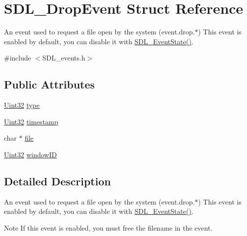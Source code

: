 \hypertarget{struct_s_d_l___drop_event}{}\section{S\+D\+L\+\_\+\+Drop\+Event Struct Reference}
\label{struct_s_d_l___drop_event}


An event used to request a file open by the system (event.\+drop.$\ast$) This event is enabled by default, you can disable it with \mbox{\hyperlink{_s_d_l__events_8h_afb772893e1c46f186fa39a4defe76df3}{S\+D\+L\+\_\+\+Event\+State()}}.  




{\ttfamily \#include $<$S\+D\+L\+\_\+events.\+h$>$}

\subsection*{Public Attributes}
\begin{DoxyCompactItemize}
\item 
\mbox{\hyperlink{_s_d_l__stdinc_8h_add440eff171ea5f55cb00c4a9ab8672d}{Uint32}} \mbox{\hyperlink{struct_s_d_l___drop_event_a5ea27cfaa5f8d4940e9a69b68b3cc035}{type}}
\item 
\mbox{\hyperlink{_s_d_l__stdinc_8h_add440eff171ea5f55cb00c4a9ab8672d}{Uint32}} \mbox{\hyperlink{struct_s_d_l___drop_event_a02d2c81bb22db632a40cd0021ff751ab}{timestamp}}
\item 
char $\ast$ \mbox{\hyperlink{struct_s_d_l___drop_event_abc41ef4beb62e1d8b56827128b29585f}{file}}
\item 
\mbox{\hyperlink{_s_d_l__stdinc_8h_add440eff171ea5f55cb00c4a9ab8672d}{Uint32}} \mbox{\hyperlink{struct_s_d_l___drop_event_a8cecd2178cdc04118bf852e7cf7bf647}{window\+ID}}
\end{DoxyCompactItemize}


\subsection{Detailed Description}
An event used to request a file open by the system (event.\+drop.$\ast$) This event is enabled by default, you can disable it with \mbox{\hyperlink{_s_d_l__events_8h_afb772893e1c46f186fa39a4defe76df3}{S\+D\+L\+\_\+\+Event\+State()}}. 

\begin{DoxyNote}{Note}
If this event is enabled, you must free the filename in the event. 
\end{DoxyNote}


